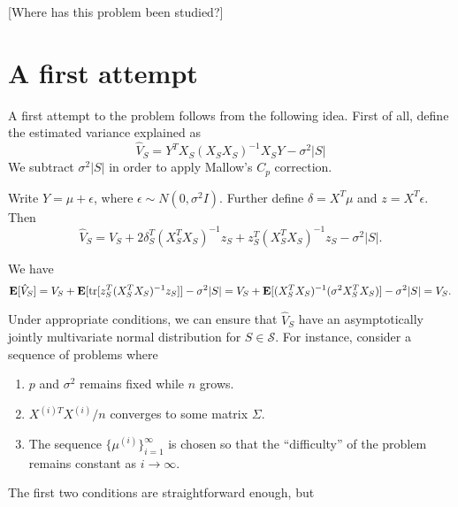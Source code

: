 \documentclass[12pt]{article}
\begin{document}
[Where has this problem been studied?]

\section{A first attempt}

A first attempt to the problem follows from the following idea.  First of all, define the estimated variance explained as
\[
\hat{V}_S = Y^T X_S (X_S X_S)^{-1} X_S Y - \sigma^2 |S|
\]
We subtract $\sigma^2 |S|$ in order to apply Mallow's $C_p$ correction.

Write $Y = \mu + \epsilon$, where $\epsilon \sim N(0, \sigma^2 I)$.  Further define $\delta = X^T \mu$ and $z = X^T \epsilon$.  Then
\[
\hat{V}_S = V_S + 2\delta_S^T (X_S^T X_S)^{-1}z_S + z_S^T (X_S^T X_S)^{-1} z_S - \sigma^2 |S|.
\]

We have
\[
\textbf{E}[\hat{V}_S] = V_S + \textbf{E}[\text{tr}[z_S^T (X_S^T X_S)^{-1} z_S]] -\sigma^2 |S| = V_S + \textbf{E}[(X_S^T X_S)^{-1} (\sigma^2 X_S^T X_S)] -\sigma^2 |S|= V_S.
\]

Under appropriate conditions, we can ensure that $\hat{V}_S$ have an
asymptotically jointly multivariate normal distribution for
$S \in \mathcal{S}.$  For instance, consider a sequence of problems where
\begin{enumerate}
\item $p$ and $\sigma^2$ remains fixed while $n$ grows.
\item $X^{(i)T} X^{(i)}/n$ converges to some matrix $\Sigma$.
\item The sequence $\{\mu^{(i)}\}_{i=1}^\infty$ is chosen so that the ``difficulty'' of the problem remains constant as $i \to \infty$.
\end{enumerate}
The first two conditions are straightforward enough, but
\end{document}

